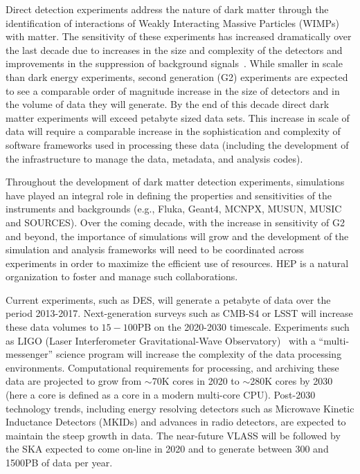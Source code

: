 \medskip


Direct detection experiments address the nature of dark matter through
the identification of interactions of Weakly Interacting Massive
Particles (WIMPs) with matter.  The sensitivity of these experiments
has increased dramatically over the last decade due to increases in
the size and complexity of the detectors and improvements in the
suppression of background signals~\cite{dmrev}. While smaller in scale
than dark energy experiments, second generation (G2) experiments are
expected to see a comparable order of magnitude increase in the size
of detectors and in the volume of data they will generate. By the end
of this decade direct dark matter experiments will exceed petabyte
sized data sets.  This increase in scale of data will require a
comparable increase in the sophistication and complexity of software
frameworks used in processing these data (including the development of
the infrastructure to manage the data, metadata, and analysis codes).

Throughout the development of dark matter detection experiments,
simulations have played an integral role in defining the properties
and sensitivities of the instruments and backgrounds (e.g., Fluka,
Geant4, MCNPX, MUSUN, MUSIC and SOURCES). Over the coming decade, with
the increase in sensitivity of G2 and beyond, the importance of
simulations will grow and the development of the simulation and
analysis frameworks will need to be coordinated across experiments in
order to maximize the efficient use of resources. HEP is a natural
organization to foster and manage such collaborations.

\medskip


Current experiments, such as DES, will generate a petabyte of data
over the period 2013-2017. Next-generation surveys such as CMB-S4 or
LSST will increase these data volumes to $15-100$PB on the 2020-2030
timescale. Experiments such as LIGO (Laser Interferometer
Gravitational-Wave Observatory)~\cite{ligo} with a ``multi-messenger''
science program will increase the complexity of the data processing
environments.  Computational requirements for processing, and
archiving these data are projected to grow from $\sim$70K cores in
2020 to $\sim$280K cores by 2030 (here a core is defined as a core in
a modern multi-core CPU). Post-2030 technology trends, including
energy resolving detectors such as Microwave Kinetic Inductance
Detectors (MKIDs) and advances in radio detectors, are expected to
maintain the steep growth in data. The near-future VLASS will be
followed by the SKA expected to come on-line in 2020 and to generate
between 300 and 1500PB of data per year.

